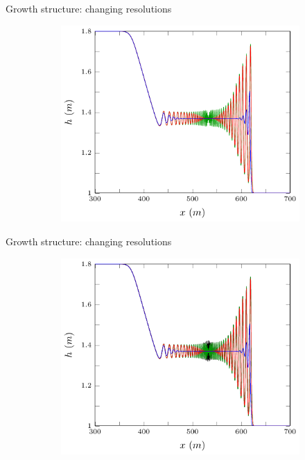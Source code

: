 \documentclass[pdf]{beamer}
\begin{document}
\begin{frame}{Growth structure: changing resolutions}
	\begin{figure}
		\begin{subfigure}{0.75\textwidth}
			\includegraphics[width=\textwidth]{../Pics/dx0/468/1-figure0.pdf}
		\end{subfigure}
	\end{figure}
\end{frame}

\begin{frame}{Growth structure: changing resolutions}
	\begin{figure}
		\begin{subfigure}{0.75\textwidth}
			\includegraphics[width=\textwidth]{../Pics/dx0/all/1-figure0.pdf}
		\end{subfigure}
	\end{figure}
\end{frame}
\end{document}
